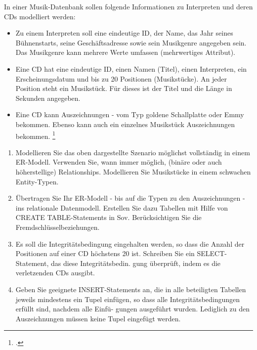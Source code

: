 \documentclass{lehramt-informatik-aufgabe}
\begin{document}

In einer Musik-Datenbank sollen folgende Informationen zu Interpreten und deren CDs modelliert
werden:

\begin{itemize}
\item Zu einem Interpreten soll eine eindeutige ID, der Name, das Jahr
seines Bühnenstarts, seine Geschäftsadresse sowie sein Musikgenre
angegeben sein. Das Musikgenre kann mehrere Werte umfassen (mehrwertiges
Attribut).

\item Eine CD hat eine eindeutige ID, einen Namen (Titel), einen
Interpreten, ein Erscheinungsdatum und bis zu 20 Positionen
(Musikstücke). An jeder Position steht ein Musikstück. Für dieses ist
der Titel und die Länge in Sekunden angegeben.

\item Eine CD kann Auszeichnungen - \zB vom Typ goldene Schallplatte
oder Emmy bekommen. Ebenso kann auch ein einzelnes Musikstück
Auszeichnungen bekommen.
\footcite{examen:66116:2015:03}
\end{itemize}
\begin{enumerate}


\item  Modellieren Sie das oben dargestellte Szenario möglichst
vollständig in einem ER-Modell. Verwenden Sie, wann immer möglich,
(binäre oder auch höherstellige) Relationships. Modellieren Sie
Musikstücke in einem schwachen Entity-Typen.


\item Übertragen Sie Ihr ER-Modell - bis auf die Typen zu den
Auszeichnungen - ins relationale Datenmodell. Erstellen Sie dazu
Tabellen mit Hilfe von CREATE TABLE-Statements in Sov. Berücksichtigen
Sie die Fremdschlüsselbeziehungen.


\item Es soll die Integritätsbedingung eingehalten werden, so dass die
Anzahl der Positionen auf einer CD höchstens 20 ist. Schreiben Sie ein
SELECT-Statement, das diese Integritätsbedin. gung überprüft, indem es
die verletzenden CDs ausgibt.


\item Geben Sie geeignete INSERT-Statements an, die in alle beteiligten
Tabellen jeweils mindestens ein Tupel einfügen, so dass alle
Integritätsbedingungen erfüllt sind, nachdem alle Einfü- gungen
ausgeführt wurden. Lediglich zu den Auszeichnungen müssen keine Tupel
eingefügt werden.
\end{enumerate}
\end{document}
